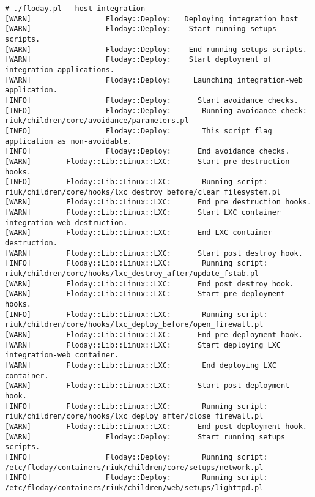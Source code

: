 \begin{lstlisting}[float=t, caption={Sortie d'une exécution de \emph{Floday}}, label=fig_1.4_floday, basicstyle=\tiny, xleftmargin=-3cm]
# ./floday.pl --host integration
[WARN]                 Floday::Deploy:   Deploying integration host
[WARN]                 Floday::Deploy:    Start running setups scripts.
[WARN]                 Floday::Deploy:    End running setups scripts.
[WARN]                 Floday::Deploy:    Start deployment of integration applications.
[WARN]                 Floday::Deploy:     Launching integration-web application.
[INFO]                 Floday::Deploy:      Start avoidance checks.
[INFO]                 Floday::Deploy:       Running avoidance check: riuk/children/core/avoidance/parameters.pl
[INFO]                 Floday::Deploy:       This script flag application as non-avoidable.
[INFO]                 Floday::Deploy:      End avoidance checks.
[WARN]        Floday::Lib::Linux::LXC:      Start pre destruction hooks.
[INFO]        Floday::Lib::Linux::LXC:       Running script: riuk/children/core/hooks/lxc_destroy_before/clear_filesystem.pl
[WARN]        Floday::Lib::Linux::LXC:      End pre destruction hooks.
[WARN]        Floday::Lib::Linux::LXC:      Start LXC container integration-web destruction.
[WARN]        Floday::Lib::Linux::LXC:      End LXC container destruction.
[WARN]        Floday::Lib::Linux::LXC:      Start post destroy hook.
[INFO]        Floday::Lib::Linux::LXC:       Running script: riuk/children/core/hooks/lxc_destroy_after/update_fstab.pl
[WARN]        Floday::Lib::Linux::LXC:      End post destroy hook.
[WARN]        Floday::Lib::Linux::LXC:      Start pre deployment hooks.
[INFO]        Floday::Lib::Linux::LXC:       Running script: riuk/children/core/hooks/lxc_deploy_before/open_firewall.pl
[WARN]        Floday::Lib::Linux::LXC:      End pre deployment hook.
[WARN]        Floday::Lib::Linux::LXC:      Start deploying LXC integration-web container.
[WARN]        Floday::Lib::Linux::LXC:       End deploying LXC container.
[WARN]        Floday::Lib::Linux::LXC:      Start post deployment hook.
[INFO]        Floday::Lib::Linux::LXC:       Running script: riuk/children/core/hooks/lxc_deploy_after/close_firewall.pl
[WARN]        Floday::Lib::Linux::LXC:      End post deployment hook.
[WARN]                 Floday::Deploy:      Start running setups scripts.
[INFO]                 Floday::Deploy:       Running script: /etc/floday/containers/riuk/children/core/setups/network.pl
[INFO]                 Floday::Deploy:       Running script: /etc/floday/containers/riuk/children/web/setups/lighttpd.pl

\end{lstlisting}
